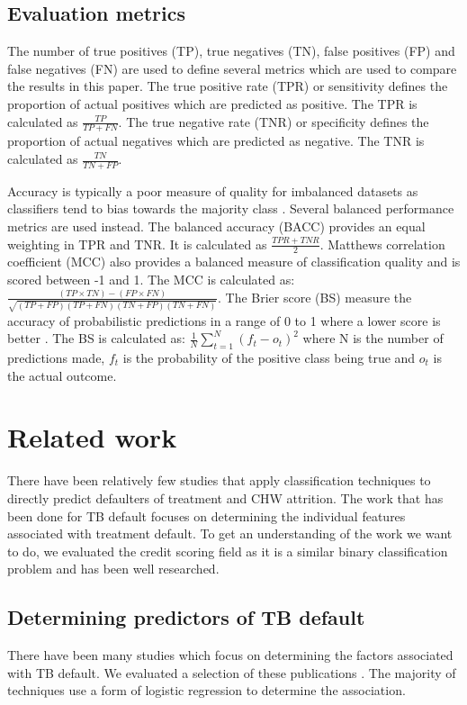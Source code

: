 \documentclass{sig-alternate-05-2015}
\begin{document}
	\subsection{Evaluation metrics}
	The number of true positives (TP), true negatives (TN), false positives (FP) and false negatives (FN) are used to define several metrics which are used to compare the results in this paper. The true positive rate (TPR) or sensitivity defines the proportion of actual positives which are predicted as positive. The TPR is calculated as $\frac{TP}{TP + FN}$. The true negative rate (TNR) or specificity defines the proportion of actual negatives which are predicted as negative. The TNR is calculated as $\frac{TN}{TN + FP}$. 
	
	Accuracy is typically a poor measure of quality for imbalanced datasets as classifiers tend to bias towards the majority class \cite{Batista:2004:SBS:1007730.1007735, Chawla:2004:ESI:1007730.1007733}. Several balanced performance metrics are used instead. The balanced accuracy (BACC) provides an equal weighting in TPR and TNR. It is calculated as $\frac{TPR + TNR}{2}$. Matthews correlation coefficient (MCC) also provides a balanced measure of classification quality and is scored between -1 and 1. The MCC is calculated as: $\frac{(TP \times TN) - (FP \times FN)}{\sqrt{(TP + FP)(TP + FN)(TN + FP)(TN + FN)}}$. The Brier score (BS) measure the accuracy of probabilistic predictions in a range of 0 to 1 where a lower score is better \cite{steyerberg2010assessing}. The BS is calculated as: $\frac{1}{N}\sum_{t=1}^{N}(f_t - o_t)^2$ where N is the number of predictions made, $f_t$ is the probability of the positive class being true and $o_t$ is the actual outcome.
	
	\section{Related work}
	There have been relatively few studies that apply classification techniques to directly predict defaulters of treatment and CHW attrition. The work that has been done for TB default focuses on determining the individual features associated with treatment default. To get an understanding of the work we want to do, we evaluated the credit scoring field as it is a similar binary classification problem and has been well researched. 
	\subsection{Determining predictors of TB default}
	\label{predictors_of_defaulters_related_work}
	There have been many studies which focus on determining the factors associated with TB default. We evaluated a selection of these publications \cite{chan:2003prevalence, Jha:10.1371/journal.pone.0008873, jittimanee:10.1111/j.1440-172X.2007.00650.x, Lackey:10356751520150601, muture:6660173120110101, Shargie:10.1371/journal.pmed.0040037}. The majority of techniques use a form of logistic regression to determine the association. 
	
\end{document}
